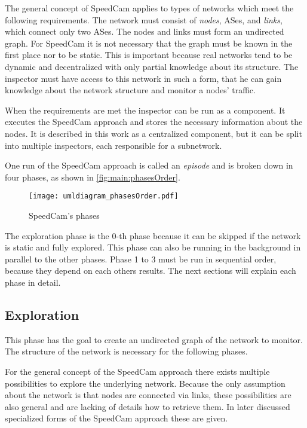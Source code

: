 \documentclass[thesis.tex]{subfiles}
\begin{document}
The general concept of SpeedCam applies to types of networks which meet the following requirements. The network must consist of \textit{nodes}, ASes, and \textit{links}, which connect only two ASes. The nodes and links must form an undirected graph. For SpeedCam it is not necessary that the graph must be known in the first place nor to be static. This is important because real networks tend to be dynamic and decentralized with only partial knowledge about its structure. The inspector must have access to this network in such a form, that he can gain knowledge about the network structure and monitor a nodes' traffic.

When the requirements are met the inspector can be run as a component. It executes the SpeedCam approach and stores the necessary information about the nodes. It is described in this work as a centralized component, but it can be split into multiple inspectors, each responsible for a subnetwork. 

One run of the SpeedCam approach is called an \textit{episode} and is broken down in four phases, as shown in \autoref{fig:main:phasesOrder}.

\begin{figure}[!h]
	\centering
	\texttt{[image: umldiagram\_phasesOrder.pdf]}
	\caption{SpeedCam's phases}
	\label{fig:main:phasesOrder}
\end{figure}

The exploration phase is the 0-th phase because it can be skipped if the network is static and fully explored. This phase can also be running in the background in parallel to the other phases. Phase 1 to 3 must be run in sequential order, because they depend on each others results. The next sections will explain each phase in detail.

\subsection{Exploration} \label{sec:main:explorationphase}
This phase has the goal to create an undirected graph of the network to monitor. The structure of the network is necessary for the following phases. 

For the general concept of the SpeedCam approach there exists multiple possibilities to explore the underlying network. Because the only assumption about the network is that nodes are connected via links, these possibilities are also general and are lacking of details how to retrieve them. In later discussed specialized forms of the SpeedCam approach these are given.
\end{document}
